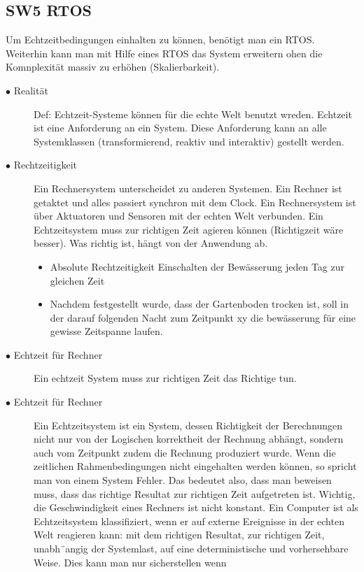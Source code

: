 \documentclass[a4paper, 8pt]{extarticle}
\begin{document}
\begin{multicols*}{3}
	\section{SW5 RTOS}
		Um Echtzeitbedingungen einhalten zu können, benötigt man ein RTOS. Weiterhin kann man mit Hilfe eines RTOS das System erweitern ohen die 
		Komnplexität massiv zu erhöhen (Skalierbarkeit).
				\begin{description}
					\item[$\bullet$ Realität]
						Def: Echtzeit-Systeme können für die echte Welt benutzt wreden.
						Echtzeit ist eine Anforderung an ein System. Diese Anforderung kann an alle Systemklassen (transformierend, reaktiv und interaktiv)
						gestellt werden.
					\item[$\bullet$ Rechtzeitigkeit]
						Ein Rechnersystem unterscheidet zu anderen Systemen. Ein Rechner ist getaktet und alles passiert synchron mit dem Clock. 
						Ein Rechnersystem ist über Aktuatoren und Sensoren mit der echten Welt verbunden. 
						Ein Echtzeitsystem muss zur richtigen Zeit agieren können (Richtigzeit wäre besser). Was richtig ist, hängt von der Anwendung ab.
						\begin{itemize}
							\item Absolute Rechtzeitigkeit Einschalten der Bewässerung jeden Tag zur gleichen Zeit 
							\item Nachdem festgestellt wurde, dass der Gartenboden trocken ist, soll in der darauf folgenden Nacht zum Zeitpunkt
							xy die bewässerung für eine gewisse Zeitspanne laufen. 
						\end{itemize}
					\item[$\bullet$ Echtzeit für Rechner]
						Ein echtzeit System muss zur richtigen Zeit das Richtige tun.
					\item[$\bullet$ Echtzeit für Rechner]
						 Ein Echtzeitsystem ist ein System, dessen Richtigkeit der Berechnungen nicht nur von der Logischen korrektheit der Rechnung
						 abhängt, sondern auch vom Zeitpunkt zudem die Rechnung produziert wurde. Wenn die zeitlichen Rahmenbedingungen nicht eingehalten werden
						 können, so spricht man von einem System Fehler. Das bedeutet also, dass man beweisen muss, dass das richtige Resultat zur richtigen Zeit
						 aufgetreten ist. Wichtig, die Geschwindigkeit eines Rechners ist nicht konstant. Ein Computer ist als Echtzeitsystem klassifiziert, wenn er
						 auf externe Ereignisse in der echten Welt reagieren kann: mit dem richtigen
						 Resultat, zur richtigen Zeit, unabh¨angig der Systemlast, auf eine deterministische und vorhersehbare Weise. Dies kann man nur sicherstellen wenn 

\end{description}
\end{multicols*}
\end{document}
